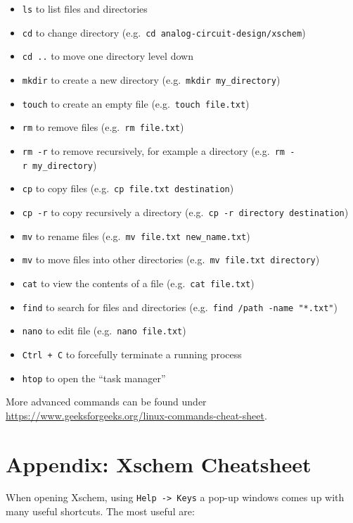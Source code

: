 \documentclass[
  a4paper,
  DIV=11,
  numbers=noendperiod]{scrartcl}
\providecommand{\tightlist}{%
  \setlength{\itemsep}{0pt}\setlength{\parskip}{0pt}}\usepackage{longtable,booktabs,array}
\begin{document}
\begin{itemize}
\tightlist
\item
  \texttt{ls} to list files and directories
\item
  \texttt{cd} to change directory
  (e.g.~\texttt{cd\ analog-circuit-design/xschem})
\item
  \texttt{cd\ ..} to move one directory level down
\item
  \texttt{mkdir} to create a new directory
  (e.g.~\texttt{mkdir\ my\_directory})
\item
  \texttt{touch} to create an empty file (e.g.~\texttt{touch\ file.txt})
\item
  \texttt{rm} to remove files (e.g.~\texttt{rm\ file.txt})
\item
  \texttt{rm\ -r} to remove recursively, for example a directory
  (e.g.~\texttt{rm\ -r\ my\_directory})
\item
  \texttt{cp} to copy files (e.g.~\texttt{cp\ file.txt\ destination})
\item
  \texttt{cp\ -r} to copy recursively a directory
  (e.g.~\texttt{cp\ -r\ directory\ destination})
\item
  \texttt{mv} to rename files
  (e.g.~\texttt{mv\ file.txt\ new\_name.txt})
\item
  \texttt{mv} to move files into other directories
  (e.g.~\texttt{mv\ file.txt\ directory})
\item
  \texttt{cat} to view the contents of a file
  (e.g.~\texttt{cat\ file.txt})
\item
  \texttt{find} to search for files and directories
  (e.g.~\texttt{find\ /path\ -name\ "*.txt"})
\item
  \texttt{nano} to edit file (e.g.~\texttt{nano\ file.txt})
\item
  \texttt{Ctrl\ +\ C} to forcefully terminate a running process
\item
  \texttt{htop} to open the ``task manager''
\end{itemize}

More advanced commands can be found under
\url{https://www.geeksforgeeks.org/linux-commands-cheat-sheet}.

\section{Appendix: Xschem Cheatsheet}\label{sec-xschem-cheatsheet}

When opening Xschem, using \texttt{Help\ -\textgreater{}\ Keys} a pop-up
windows comes up with many useful shortcuts. The most useful are:
\end{document}
